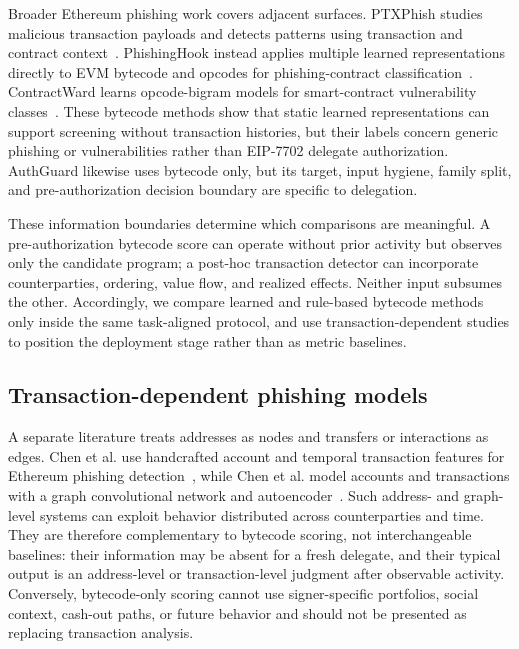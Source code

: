 Broader Ethereum phishing work covers adjacent surfaces. PTXPhish studies malicious transaction payloads and detects patterns using transaction and contract context~\cite{chen2025ptxphish}. PhishingHook instead applies multiple learned representations directly to EVM bytecode and opcodes for phishing-contract classification~\cite{derosa2025phishinghook}. ContractWard learns opcode-bigram models for smart-contract vulnerability classes~\cite{wang2021contractward}. These bytecode methods show that static learned representations can support screening without transaction histories, but their labels concern generic phishing or vulnerabilities rather than EIP-7702 delegate authorization. AuthGuard likewise uses bytecode only, but its target, input hygiene, family split, and pre-authorization decision boundary are specific to delegation.

These information boundaries determine which comparisons are meaningful. A pre-authorization bytecode score can operate without prior activity but observes only the candidate program; a post-hoc transaction detector can incorporate counterparties, ordering, value flow, and realized effects. Neither input subsumes the other. Accordingly, we compare learned and rule-based bytecode methods only inside the same task-aligned protocol, and use transaction-dependent studies to position the deployment stage rather than as metric baselines.

\subsection{Transaction-dependent phishing models}

A separate literature treats addresses as nodes and transfers or interactions as edges. Chen et al. use handcrafted account and temporal transaction features for Ethereum phishing detection~\cite{chen2020ijcai}, while Chen et al. model accounts and transactions with a graph convolutional network and autoencoder~\cite{chen2020toit}. Such address- and graph-level systems can exploit behavior distributed across counterparties and time. They are therefore complementary to bytecode scoring, not interchangeable baselines: their information may be absent for a fresh delegate, and their typical output is an address-level or transaction-level judgment after observable activity. Conversely, bytecode-only scoring cannot use signer-specific portfolios, social context, cash-out paths, or future behavior and should not be presented as replacing transaction analysis.

